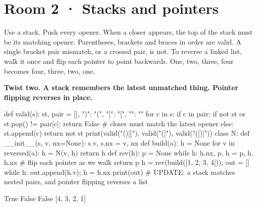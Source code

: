 \documentclass[11pt,a4paper]{report}
\begin{document}
\section*{Room 2 · Stacks and pointers}
Use a stack. Push every opener. When a closer appears, the top of the stack must be its matching opener. Parentheses, brackets and braces in order are valid. A single bracket pair mismatch, or a crossed pair, is not. To reverse a linked list, walk it once and flip each pointer to point backwards. One, two, three, four becomes four, three, two, one.
\begin{tcolorbox}[colback=yellow!12,colframe=orange!70!black,boxrule=0.4pt,left=4pt,right=4pt,top=2pt,bottom=2pt]\textbf{Twist two. A stack remembers the latest unmatched thing. Pointer flipping reverses in place.}\end{tcolorbox}
\begin{Code}
def valid(s):
    st, pair = [], {")": "(", "]": "[", "}": "{"}
    for c in s:
        if c in pair:
            if not st or st.pop() != pair[c]: return False   # closer must match the latest opener
        else: st.append(c)
    return not st
print(valid("()[]{}"), valid("(]"), valid("([)]"))
class N:
    def __init__(s, v, nx=None): s.v, s.nx = v, nx
def build(a):
    h = None
    for v in reversed(a): h = N(v, h)
    return h
def rev(h):
    p = None
    while h: h.nx, p, h = p, h, h.nx        # flip each pointer as we walk
    return p
h = rev(build([1, 2, 3, 4])); out = []
while h: out.append(h.v); h = h.nx
print(out)
# UPDATE: a stack matches nested pairs, and pointer flipping reverses a list
\end{Code}
\begin{Out}
True False False
[4, 3, 2, 1]
\end{Out}
\end{document}
